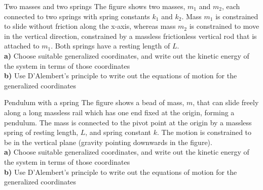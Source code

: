 \begin{problem}{Two masses and two springs}
\label{prob_VirtWork_6}
The figure shows two masses, $m_1$ and $m_2$, each connected to two springs with spring constants $k_1$ and $k_2$. Mass $m_1$ is constrained to slide without friction along the x-axis, whereas mass $m_2$ is constrained to move in the vertical direction, constrained by a massless frictionless vertical rod that is attached to $m_1$. Both springs have a resting length of $L$.
\\
\textbf{a)} Choose suitable generalized coordinates, and write out the kinetic energy of the system in terms of those coordinates\\
\textbf{b)} Use D'Alembert's principle to write out the equations of motion for the generalized coordinates
\end{problem}

\begin{problem}{Pendulum with a spring}
\label{prob_VirtWork_7}
The figure shows a bead of mass, $m$, that can slide freely along a long massless rail which has one end fixed at the origin, forming a pendulum. The mass is connected to the pivot point at the origin by a massless spring of resting length, $L$, and spring constant $k$. The motion is constrained to be in the vertical plane (gravity pointing downwards in the figure).
\\
\textbf{a)} Choose suitable generalized coordinates, and write out the kinetic energy of the system in terms of those coordinates\\
\textbf{b)} Use D'Alembert's principle to write out the equations of motion for the generalized coordinates
\end{problem}
